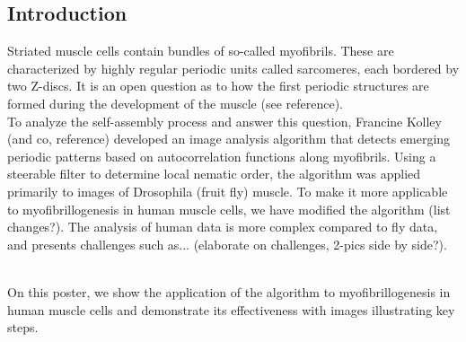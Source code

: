 \documentclass[a1,portrait]{a0poster}
\begin{document}
\begin{multicols}{2} %



\color{SaddleBrown} %

\section*{Introduction}
Striated muscle cells contain bundles of so-called myofibrils. These are characterized by highly regular periodic units called sarcomeres, each bordered by two Z-discs. It is an open question as to how the first periodic structures are formed during the development of the muscle (see reference).\\
To analyze the self-assembly process and answer this question, Francine Kolley (and co, reference) developed an image analysis algorithm that detects emerging periodic patterns based on autocorrelation functions along myofibrils. Using a steerable filter to determine local nematic order, the algorithm was applied primarily to images of Drosophila (fruit fly) muscle. To make it more applicable to myofibrillogenesis in human muscle cells, we have modified the algorithm (list changes?). The analysis of human data is more complex compared to fly data, and presents challenges such as... (elaborate on challenges, 2-pics side by side?).\\
\begin{minipage}{0.45\textwidth}
    \centering
    
\end{minipage}\\
On this poster, we show the application of the algorithm to myofibrillogenesis in human muscle cells and demonstrate its effectiveness with images illustrating key steps.


\color{DarkSlateGray} %


\end{multicols}
\end{document}
